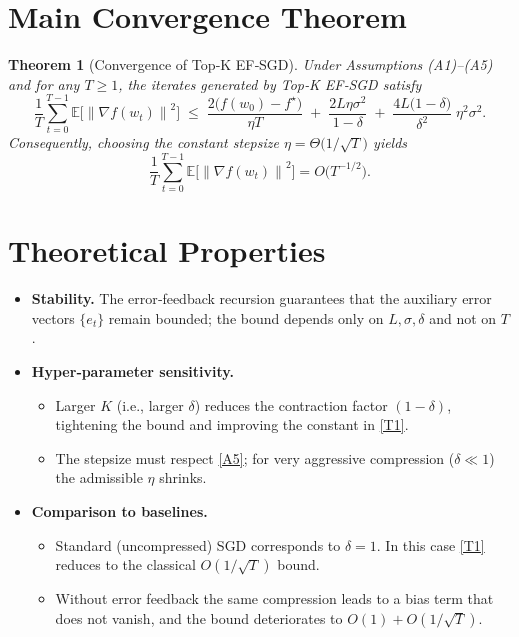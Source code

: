 \documentclass{article}
\newtheorem{theorem}{Theorem}
\newcommand{\E}{\mathbb{E}}
\newcommand{\norm}[1]{\left\|#1\right\|}
\begin{document}
\section*{Main Convergence Theorem}
\begin{theorem}[Convergence of Top‑K EF‑SGD]\label{thm:main}
Under Assumptions (A1)–(A5) and for any $T\ge1$, the iterates generated by
Top‑K EF‑SGD satisfy
\[
\frac{1}{T}\sum_{t=0}^{T-1}\E\!\big[\norm{\nabla f(w_t)}^{2}\big]
\;\le\;
\frac{2\big(f(w_0)-f^\star\big)}{\eta T}
\;+\;
\frac{2L\eta\sigma^{2}}{1-\delta}
\;+\;
\frac{4L\big(1-\delta\big)}{\delta^{2}}\;\eta^{2}\sigma^{2}.
\tag{T1}
\]
Consequently, choosing the constant stepsize $\eta = \Theta\!\big(1/\sqrt{T}\big)$
yields
\[
\frac{1}{T}\sum_{t=0}^{T-1}\E\!\big[\norm{\nabla f(w_t)}^{2}\big]
= O\!\big(T^{-1/2}\big).
\]
\end{theorem}

\section*{Theoretical Properties}
\begin{itemize}
\item \textbf{Stability.} The error‑feedback recursion guarantees that the
auxiliary error vectors $\{e_t\}$ remain bounded; the bound depends only on
$L,\sigma,\delta$ and not on $T$.
\item \textbf{Hyper‑parameter sensitivity.}
    \begin{itemize}
    \item Larger $K$ (i.e., larger $\delta$) reduces the contraction factor
          $(1-\delta)$, tightening the bound and improving the constant in
          \eqref{T1}.
    \item The stepsize must respect \eqref{A5}; for very aggressive
          compression ($\delta\ll1$) the admissible $\eta$ shrinks.
    \end{itemize}
\item \textbf{Comparison to baselines.}
    \begin{itemize}
    \item Standard (uncompressed) SGD corresponds to $\delta=1$.
          In this case \eqref{T1} reduces to the classical
          $O(1/\sqrt{T})$ bound.
    \item Without error feedback the same compression leads to a bias term
          that does not vanish, and the bound deteriorates to
          $O(1)+O(1/\sqrt{T})$.
    \end{itemize}
\end{itemize}
\end{document}
